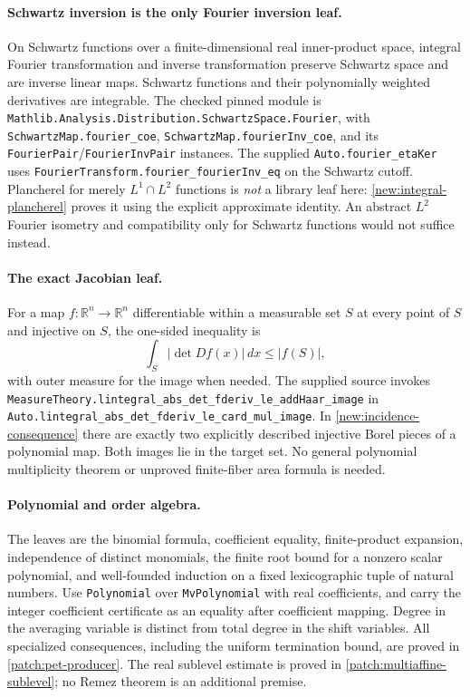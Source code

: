 \documentclass[11pt]{article}
\theoremstyle{definition}
\newcommand{\pid}[1]{\nolinkurl{#1}}
\newcommand{\R}{\mathbb R}
\begin{document}
\paragraph{Schwartz inversion is the only Fourier inversion leaf.}
On Schwartz functions over a finite-dimensional real inner-product space, integral Fourier
transformation and inverse transformation preserve Schwartz space and are inverse linear maps.
Schwartz functions and their polynomially weighted derivatives are integrable. The checked
pinned module is \pid{Mathlib.Analysis.Distribution.SchwartzSpace.Fourier}, with
\pid{SchwartzMap.fourier_coe}, \pid{SchwartzMap.fourierInv_coe}, and its
\pid{FourierPair}/\pid{FourierInvPair} instances. The supplied
\pid{Auto.fourier_etaKer} uses \pid{FourierTransform.fourier_fourierInv_eq} on the Schwartz
cutoff. Plancherel for merely $L^1\cap L^2$ functions is \emph{not} a library leaf here:
\cref{new:integral-plancherel} proves it using the explicit approximate identity. An abstract
$L^2$ Fourier isometry and compatibility only for Schwartz functions would not suffice instead.

\paragraph{The exact Jacobian leaf.}
For a map $f:\R^n\to\R^n$ differentiable within a measurable set $S$ at every point of $S$
and injective on $S$, the one-sided inequality is
\[
 \int_S|\det Df(x)|\,dx\leq |f(S)|,
\]
with outer measure for the image when needed. The supplied source invokes
\pid{MeasureTheory.lintegral_abs_det_fderiv_le_addHaar_image} in
\pid{Auto.lintegral_abs_det_fderiv_le_card_mul_image}. In \cref{new:incidence-consequence}
there are exactly two explicitly described injective Borel pieces of a polynomial map.
Both images lie in the target set. No general polynomial multiplicity theorem or unproved
finite-fiber area formula is needed.

\paragraph{Polynomial and order algebra.}
The leaves are the binomial formula, coefficient equality, finite-product expansion,
independence of distinct monomials, the finite root bound for a nonzero scalar polynomial,
and well-founded induction on a fixed lexicographic tuple of natural numbers.
Use \pid{Polynomial} over \pid{MvPolynomial} with real coefficients, and carry the integer
coefficient certificate as an equality after coefficient mapping. Degree in the averaging
variable is distinct from total degree in the shift variables. All specialized consequences,
including the uniform termination bound, are proved in \cref{patch:pet-producer}.
The real sublevel estimate is proved in \cref{patch:multiaffine-sublevel}; no Remez theorem
is an additional premise.
\end{document}

